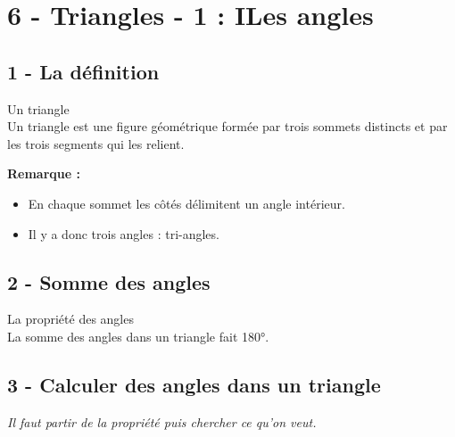 



\section*{6 - Triangles - 1 : ILes angles}

\subsection*{1 - La définition}

\begin{Definition}{Un triangle}\\
 Un triangle est une figure géométrique formée par trois sommets distincts et par les trois segments qui les relient.
\end{Definition}

\textbf{Remarque : }

\begin{itemize}[label={$\bullet$}]
  \item En chaque sommet les côtés délimitent un angle intérieur. 
  \item Il y a donc trois angles : tri-angles.
\end{itemize}


\subsection*{2 - Somme des angles}

\begin{Definition}{La propriété des angles}\\
  La somme des angles dans un triangle fait 180°.
\end{Definition}


\subsection*{3 - Calculer des angles dans un triangle}

\textit{Il faut partir de la propriété puis chercher ce qu'on veut.} \\

